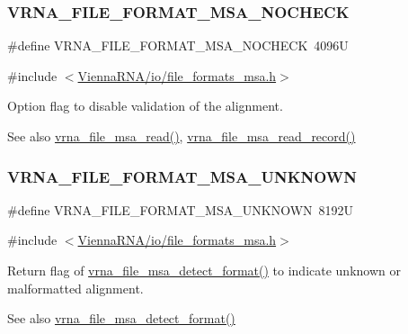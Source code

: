 \subsubsection{\texorpdfstring{VRNA\_FILE\_FORMAT\_MSA\_NOCHECK}{VRNA\_FILE\_FORMAT\_MSA\_NOCHECK}}
{\footnotesize\ttfamily \#define V\+R\+N\+A\+\_\+\+F\+I\+L\+E\+\_\+\+F\+O\+R\+M\+A\+T\+\_\+\+M\+S\+A\+\_\+\+N\+O\+C\+H\+E\+CK~4096U}



{\ttfamily \#include $<$\mbox{\hyperlink{io_2file__formats__msa_8h}{Vienna\+R\+N\+A/io/file\+\_\+formats\+\_\+msa.\+h}}$>$}



Option flag to disable validation of the alignment. 

\begin{DoxySeeAlso}{See also}
\mbox{\hyperlink{group__file__formats__msa_gad02d5d12bda54611c915a1019323b7be}{vrna\+\_\+file\+\_\+msa\+\_\+read()}}, \mbox{\hyperlink{group__file__formats__msa_gad4203a438622b2df7bc2f16578d54799}{vrna\+\_\+file\+\_\+msa\+\_\+read\+\_\+record()}} 
\end{DoxySeeAlso}
\mbox{\label{group__file__formats__msa_gabdc948f547e550125de3e7c65878400c}} 
\subsubsection{\texorpdfstring{VRNA\_FILE\_FORMAT\_MSA\_UNKNOWN}{VRNA\_FILE\_FORMAT\_MSA\_UNKNOWN}}
{\footnotesize\ttfamily \#define V\+R\+N\+A\+\_\+\+F\+I\+L\+E\+\_\+\+F\+O\+R\+M\+A\+T\+\_\+\+M\+S\+A\+\_\+\+U\+N\+K\+N\+O\+WN~8192U}



{\ttfamily \#include $<$\mbox{\hyperlink{io_2file__formats__msa_8h}{Vienna\+R\+N\+A/io/file\+\_\+formats\+\_\+msa.\+h}}$>$}



Return flag of \mbox{\hyperlink{group__file__formats__msa_gade4fa8136ebb2d0f7eb3f8b59a8658e3}{vrna\+\_\+file\+\_\+msa\+\_\+detect\+\_\+format()}} to indicate unknown or malformatted alignment. 

\begin{DoxySeeAlso}{See also}
\mbox{\hyperlink{group__file__formats__msa_gade4fa8136ebb2d0f7eb3f8b59a8658e3}{vrna\+\_\+file\+\_\+msa\+\_\+detect\+\_\+format()}} 
\end{DoxySeeAlso}
\mbox{\label{group__file__formats__msa_ga1577ea0f497d9c501549c863a4f2c089}} 
